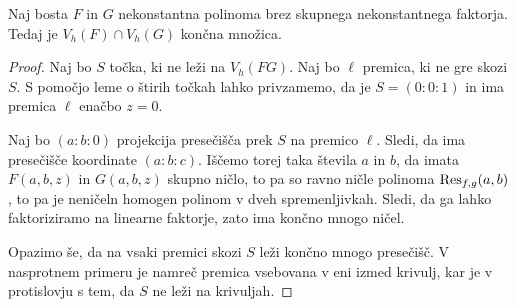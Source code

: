 \begin{trditev}
Naj bosta $F$ in $G$ nekonstantna polinoma brez skupnega
nekonstantnega faktorja. Tedaj je $V_h(F) \cap V_h(G)$ končna
množica. %
\end{trditev}

\begin{proof}
Naj bo $S$ točka, ki ne leži na $V_h(FG)$. Naj bo $\ell$ premica,
ki ne gre skozi $S$. S pomočjo leme o štirih točkah lahko
privzamemo, da je $S = (0 : 0 : 1)$ in ima premica $\ell$ enačbo
$z = 0$.

Naj bo $(a : b : 0)$ projekcija presečišča prek $S$ na premico
$\ell$. Sledi, da ima presečišče koordinate $(a : b : c)$. Iščemo
torej taka števila $a$ in $b$, da imata $F(a, b, z)$ in
$G(a, b, z)$ skupno ničlo, to pa so ravno ničle polinoma
$\operatorname{Res}_{f,g}(a,b)$, to pa je neničeln homogen polinom v dveh
spremenljivkah. Sledi, da ga lahko faktoriziramo na linearne
faktorje, zato ima končno mnogo ničel.

Opazimo še, da na vsaki premici skozi $S$ leži končno mnogo
presečišč. V nasprotnem primeru je namreč premica vsebovana v eni
izmed krivulj, kar je v protislovju s tem, da $S$ ne leži na
krivuljah. 
\end{proof}
